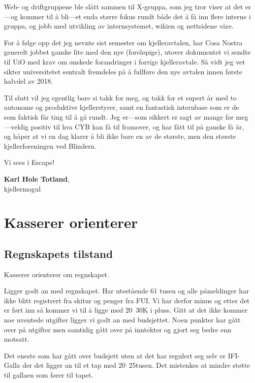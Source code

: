 \documentclass[10pt,norsk,a4paper]{article}
\begin{document}
\begin{multicols}{2}
	Web- og driftgruppene ble slått sammen til X-gruppa, som jeg tror viser at det er---og kommer til å bli---et enda større fokus rundt både det å få inn flere interne i gruppa, og jobb med utvikling av internsystemet, wikien og nettsidene våre.

	For å følge opp det jeg nevnte sist semester om kjelleravtalen, har Cosa Nostra generelt jobbet ganske lite med den nye (foreløpige), utover dokumentet vi sendte til UiO med krav om ønskede forandringer i forrige kjelleravtale. Så vidt jeg vet sikter universitetet sentralt fremdeles på å fullføre den nye avtalen innen første halvdel av 2018.

	Til slutt vil jeg egentlig bare si takk for meg, og takk for et supert år med to autonome og produktive kjellerstyrer, samt en fantastisk internbase som er de som faktisk får ting til å gå rundt. Jeg er---som sikkert er sagt av mange før meg---veldig positiv til hva CYB kan få til framover, og har fått til på ganske få år, og håper at vi en dag klarer å bli ikke bare en av de største, men den største kjellerforeningen ved Blindern.

	Vi sees i Escape!

	\textbf{Karl Hole Totland}, \\
	kjellermogul \\
	\date{14.\ november 2017}
\end{multicols}


\section{Kasserer orienterer}
\subsection{Regnskapets tilstand}
Kasserer orienterer om regnskapet.

Ligger godt an med regnskapet. Har utestående 61 tusen og alle påmeldinger har
ikke blitt registrert fra skitur og penger fra FUI. Vi har derfor minus og etter
det er ført inn så kommer vi til å ligge med 20~30K i pluss. Gitt at det ikke
kommer noe uventede utgifter ligger vi godt an med budsjettet. Noen punkter
har gått over på utgifter men samtidig gått over på inntekter og gjort seg
bedre enn motsatt.

Det eneste som har gått over budsjett uten at det har regulert seg selv er
IFI-Galla der det ligger an til et tap med 20~25tusen. Det mistenkes at mindre
støtte til gallaen som fører til tapet.
\end{document}
